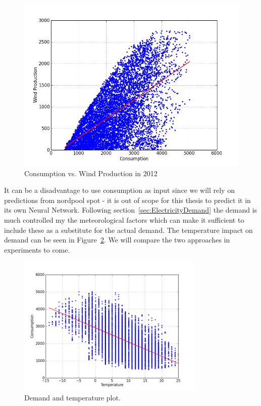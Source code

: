 \begin{figure}[H]
\centering
\includegraphics[width=0.99\linewidth,natwidth=898,natheight=587]{billeder/consumptionVsWindProduction.png}
\caption{Consumption vs. Wind Production in 2012}
\label{fig:consumptionVsWindProduction}
\end{figure}

It can be a disadvantage to use consumption as input since we will rely on predictions from nordpool spot - it is out of scope for this thesis to predict it in its own Neural Network. Following section~\ref{sec:ElectricityDemand} the demand is much controlled my the meteorological factors which can make it sufficient to include these as a substitute for the actual demand. The temperature impact on demand can be seen in Figure~\ref{fig:consump_temp_green}. We will compare the two approaches in experiments to come.

\begin{figure}[H]
\centering
\includegraphics[width=0.8\textwidth ,natwidth=410,natheight=237]{billeder/energy_price_plots/consump_temp.png}
\caption{Demand and temperature plot.}
\label{fig:consump_temp_green}
\end{figure}

